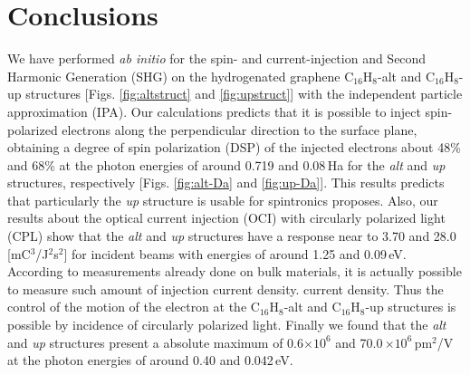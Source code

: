 \documentclass[aps,pra,11pt,tightenlines,showpacs,superscriptaddress,groupedaddress]{revtex4-1}
\newcommand{\altstc}{C$_{16}$H$_{8}$-alt}
\newcommand{\upstc}{C$_{16}$H$_{8}$-up}
\begin{document}

\section{Conclusions} %
\label{sec:conclusions}

We have performed \emph{ab initio} for the spin- and  current-injection and
Second Harmonic Generation (SHG) on the hydrogenated graphene {\altstc} and
{\upstc} structures [Figs. \ref{fig:altstruct} and \ref{fig:upstruct}] with the
independent particle approximation (IPA). Our calculations predicts that it is
possible to inject spin-polarized electrons along the perpendicular direction
to the surface plane, obtaining a degree of spin polarization (DSP) of the
injected electrons about 48\% and 68\% at the photon energies of around 0.719
and 0.08\,Ha  for the \emph{alt} and \emph{up} structures, respectively [Figs.
\ref{fig:alt-Da} and \ref{fig:up-Da}]. This results predicts that particularly
the \emph{up} structure is usable for spintronics proposes. Also, our results
about the optical current injection (OCI) with circularly polarized light (CPL)
show that the \emph{alt}  and \emph{up} structures have a response near to 3.70
and 28.0\,[mC$^{3}$/J$^{2}$s$^{2}$] for incident beams with energies of around
1.25 and 0.09\,eV. According to measurements already done on bulk materials, it
is actually possible to measure such amount of injection current density.
current density. Thus the control of the motion of the electron at the
{\altstc} and {\upstc} structures is possible by incidence of circularly
polarized light. Finally we found that the \emph{alt} and \emph{up} structures
present a absolute maximum of 0.6$\times 10^{6}$ and 70.0\,$\times 10^{6}
$\,pm$^{2}$/V at the photon energies of around 0.40 and 0.042\,eV.



\end{document}
